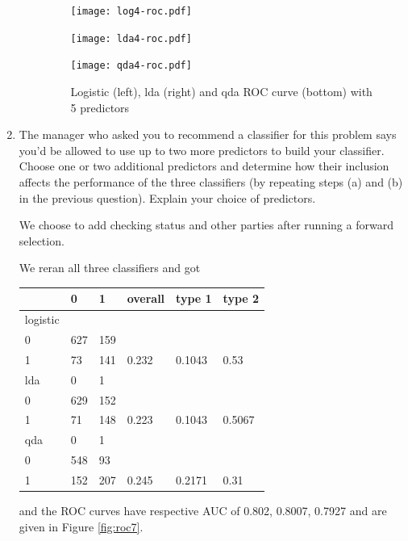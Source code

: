 \documentclass[11pt]{article}
\begin{document}
\begin{enumerate}
\begin{enumerate}
  \begin{figure}[htb]
  \caption{Logistic (left), lda  (right) and qda ROC curve (bottom) with 5 predictors}
  \label{roc5pred}
  \begin{minipage}{0.48\linewidth}
  \texttt{[image: log4-roc.pdf]}
\end{minipage}
\begin{minipage}{0.48\linewidth}
  \texttt{[image: lda4-roc.pdf]}
  \end{minipage}
  \centering
    \texttt{[image: qda4-roc.pdf]}
  \end{figure}

    
  \end{enumerate}
\item The manager who asked you to recommend a classifier for this problem says you'd be allowed to use up to two more predictors to build your classifier. Choose one or two additional predictors and determine how their inclusion affects the performance of the three classifiers (by repeating steps (a) and (b) in the previous question). Explain your choice of predictors.

   We choose to add checking status and other parties after running a forward selection.

  We reran all three classifiers and got

\begin{center}
  \begin{tabular}{| lll | lll |}
  \hline
    & 0 & 1 & overall & type 1 & type 2 \\
    \hline
    logistic &&&&&\\
      0& 627& 159&&&\\
      1  & 73& 141& 0.232 & 0.1043 & 0.53 \\
      \hline
     lda     &  0&   1&&&\\
      0 &629& 152& & & \\
      1&  71& 148 & 0.223 &  0.1043 &  0.5067  \\
      \hline
 qda   & 0  & 1&&&\\
  0 &548&  93&&&\\
  1 &152& 207&0.245 & 0.2171 & 0.31 \\
\hline
    \end{tabular}
    \end{center}
    
  and the ROC curves  have respective AUC of 0.802, 0.8007, 0.7927 and are given in Figure \ref{fig:roc7}.




\end{enumerate}
\end{document}
